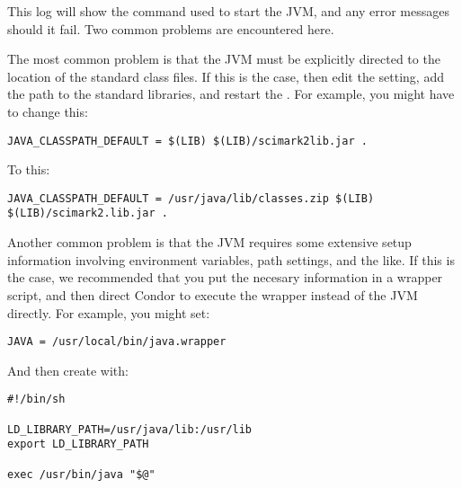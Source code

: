 This log will show the command used to start the JVM, and
any error messages should it fail.  Two common problems
are encountered here.

The most common problem is that the JVM
must be explicitly directed to the location
of the standard class files.  If this is the case, then
edit the  setting, add the
path to the standard libraries, and restart the .
For example, you might have to change this:

\begin{verbatim}
JAVA_CLASSPATH_DEFAULT = $(LIB) $(LIB)/scimark2lib.jar .
\end{verbatim}

To this:

\begin{verbatim}
JAVA_CLASSPATH_DEFAULT = /usr/java/lib/classes.zip $(LIB) $(LIB)/scimark2.lib.jar .
\end{verbatim}

Another common problem is that the JVM requires some extensive 
setup information involving environment variables, path settings,
and the like. If this is the case, we recommended that you put
the necesary information in a wrapper script, and then direct Condor to
execute the wrapper instead of the JVM directly.  For example,
you might set:

\begin{verbatim}
JAVA = /usr/local/bin/java.wrapper
\end{verbatim}

And then create  with:

\begin{verbatim}
#!/bin/sh

LD_LIBRARY_PATH=/usr/java/lib:/usr/lib
export LD_LIBRARY_PATH

exec /usr/bin/java "$@"
\end{verbatim}
